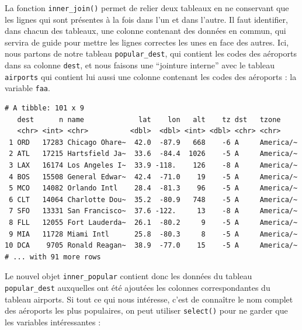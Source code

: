 \documentclass[a4paperpaper,]{article}
\newenvironment{Shaded}{\begin{snugshade}}{\end{snugshade}}
\newcommand{\DataTypeTok}[1]{\textcolor[rgb]{0.00,0.34,0.68}{#1}}
\newcommand{\KeywordTok}[1]{\textcolor[rgb]{0.12,0.11,0.11}{\textbf{#1}}}
\newcommand{\NormalTok}[1]{\textcolor[rgb]{0.12,0.11,0.11}{#1}}
\newcommand{\OperatorTok}[1]{\textcolor[rgb]{0.12,0.11,0.11}{#1}}
\newcommand{\StringTok}[1]{\textcolor[rgb]{0.75,0.01,0.01}{#1}}
\begin{document}
La fonction \texttt{inner\_join()} permet de relier deux tableaux en ne conservant que les lignes qui sont présentes à la fois dans l'un et dans l'autre. Il faut identifier, dans chacun des tableaux, une colonne contenant des données en commun, qui servira de guide pour mettre les lignes correctes les unes en face des autres. Ici, nous partons de notre tableau \texttt{popular\_dest}, qui contient les codes des aéroports dans sa colonne \texttt{dest}, et nous faisons une ``jointure interne'' avec le tableau \texttt{airports} qui contient lui aussi une colonne contenant les codes des aéroports : la variable \texttt{faa}.

\begin{Shaded}
\end{Shaded}

\begin{verbatim}
# A tibble: 101 x 9
   dest      n name             lat    lon   alt    tz dst   tzone    
   <chr> <int> <chr>          <dbl>  <dbl> <int> <dbl> <chr> <chr>    
 1 ORD   17283 Chicago Ohare~  42.0  -87.9   668    -6 A     America/~
 2 ATL   17215 Hartsfield Ja~  33.6  -84.4  1026    -5 A     America/~
 3 LAX   16174 Los Angeles I~  33.9 -118.    126    -8 A     America/~
 4 BOS   15508 General Edwar~  42.4  -71.0    19    -5 A     America/~
 5 MCO   14082 Orlando Intl    28.4  -81.3    96    -5 A     America/~
 6 CLT   14064 Charlotte Dou~  35.2  -80.9   748    -5 A     America/~
 7 SFO   13331 San Francisco~  37.6 -122.     13    -8 A     America/~
 8 FLL   12055 Fort Lauderda~  26.1  -80.2     9    -5 A     America/~
 9 MIA   11728 Miami Intl      25.8  -80.3     8    -5 A     America/~
10 DCA    9705 Ronald Reagan~  38.9  -77.0    15    -5 A     America/~
# ... with 91 more rows
\end{verbatim}

Le nouvel objet \texttt{inner\_popular} contient donc les données du tableau \texttt{popular\_dest} auxquelles ont été ajoutées les colonnes correspondantes du tableau airports. Si tout ce qui nous intéresse, c'est de connaître le nom complet des aéroports les plus populaires, on peut utiliser \texttt{select()} pour ne garder que les variables intéressantes :
\end{document}
